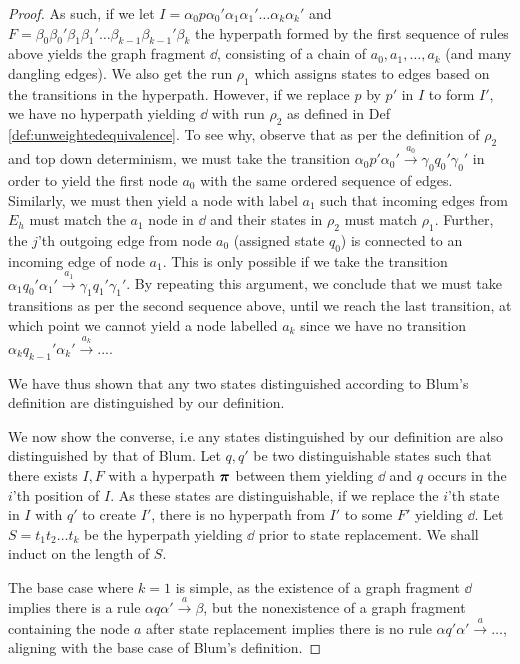 \documentclass[11pt]{article}
\begin{document}
\begin{proof}
  As such, if we let $I =  \alpha_0 p \alpha_0' \alpha_1 \alpha_1'\ldots
  \alpha_k\alpha_k'$ and $F =
  \beta_0\beta_0'\beta_1\beta_1'\ldots\beta_{k-1}\beta_{k-1}' \beta_k$ the
  hyperpath formed by the first sequence of rules above yields the graph
  fragment $\dd$, consisting of a chain of $a_0, a_1,\ldots, a_k$ (and many
  dangling edges). We also get the run $\rho_1$ which assigns states to edges
  based on the transitions in the hyperpath. However, if we replace $p$ by $p'$
  in $I$ to form $I'$, we have no hyperpath yielding $\dd$ with run $\rho_2$ as
  defined in Def \ref{def:unweightedequivalence}. To see why, observe that as
  per the definition of $\rho_2$ and top down determinism, we must take the
  transition $\alpha_0 p' \alpha_0' \xrightarrow{a_0} \gamma_0 q_0' \gamma_0'$
  in order to yield the first node $a_0$ with the same ordered sequence of
  edges. Similarly, we must then yield a node with label $a_1$ such that
  incoming edges from $E_h$ must match the $a_1$ node in $\dd$ and their states
  in $\rho_2$ must match $\rho_1$. Further, the $j$'th outgoing edge from node
  $a_0$ (assigned state $q_0$) is connected to an incoming edge of node $a_1$.
  This is only possible if we take the transition $\alpha_1 q_0' \alpha_1'
  \xrightarrow{a_1} \gamma_1 q_1' \gamma_1'$. By repeating this argument, we
  conclude that we must take transitions as per the second sequence above, until
  we reach the last transition, at which point we cannot yield a node labelled
  $a_k$ since we have no transition $\alpha_k q_{k-1}' \alpha_k'
  \overset{a_k}{\rightarrow} ...$.

  We have thus shown that any two states distinguished according to Blum's
  definition are distinguished by our definition. 
  
  We now show the converse, i.e any states distinguished by our definition are
  also distinguished by that of Blum. Let $q, q'$ be two distinguishable states
  such that there exists $I,F$ with a hyperpath $\boldsymbol{\pi}$ between them yielding
  $\dd$ and $q$ occurs in the $i$'th position of $I$. As these states are
  distinguishable, if we replace the $i$'th state in $I$ with $q'$ to create
  $I'$, there is no hyperpath from $I'$ to some $F'$ yielding $\dd$. Let $S =
  t_1t_2\ldots t_k$ be the hyperpath yielding $\dd$ prior to state replacement.
  We shall induct on the length of $S$.

  The base case where $k=1$ is simple, as the existence of a graph fragment
  $\dd$ implies there is a rule $\alpha q \alpha' \xrightarrow{a} \beta$, but
  the nonexistence of a graph fragment containing the node $a$ after state
  replacement implies there is no rule $\alpha q' \alpha' \xrightarrow{a}
  \ldots$, aligning with the base case of Blum's definition.


\end{proof}
\end{document}
